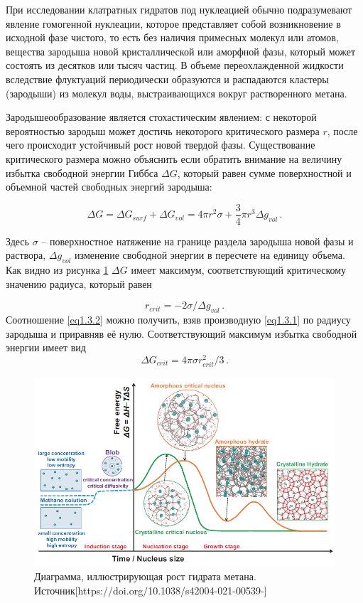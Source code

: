 \par При исследовании клатратных гидратов под нуклеацией обычно подразумевают явление гомогенной нуклеации, которое представляет собой возникновение в исходной фазе чистого, то есть без наличия примесных молекул или атомов, вещества зародыша новой кристаллической или аморфной фазы, который может состоять из десятков или тысяч частиц. В объеме переохлажденной жидкости вследствие флуктуаций периодически образуются и распадаются кластеры (зародыши) из молекул воды, выстраивающихся вокруг растворенного метана.

\par Зародышеообразование является стохастическим явлением: с некоторой вероятностью зародыш может достичь некоторого критического размера $r$, после чего происходит устойчивый рост новой твердой фазы. Существование критического размера можно объяснить если обратить внимание на величину избытка свободной энергии Гиббса $\Delta G$, который равен сумме поверхностной и объемной частей свободных энергий зародыша:

\begin{equation}
\Delta G = \Delta G_{surf} + \Delta G_{vol} = 4\pi r^2 \sigma + \frac{3}{4}\pi r^3 \Delta g_{vol} \, .
\label{eq1.3.1}
\end{equation}

Здесь $\sigma$ -- поверхностное натяжение на границе раздела зародыша новой фазы и раствора, $\Delta g_{vol}$ изменение свободной энергии в пересчете на единицу объема. Как видно из рисунка \ref{fig1.3.1} $\Delta G$ имеет максимум, соответствующий критическому значению радиуса, который равен

\begin{equation}
    r_{crit} = -2\sigma/\Delta g_{vol} \,.
    \label{eq1.3.2}
\end{equation}
Соотношение \ref{eq1.3.2} можно получить, взяв производную \ref{eq1.3.1} по радиусу зародыша и приравняв её нулю. Соответствующий максимум избытка свободной энергии имеет вид
\begin{equation}
    \Delta G_{crit} = 4\pi\sigma r_{crit}^2 / 3 \,.
    \label{eq1.3.3}
\end{equation}

\begin{figure}[H] 
    \centering
    \includegraphics[width=.9\linewidth]{figures/hydrnucl.png}
    \caption{Диаграмма, иллюстрирующая рост гидрата метана. Источник[https://doi.org/10.1038/s42004-021-00539-]}
    \label{fig1.3.1}
\end{figure}

